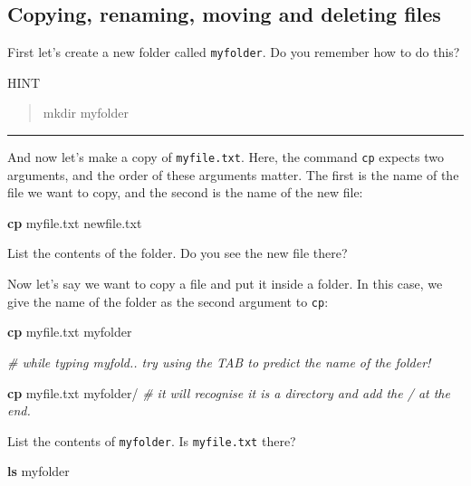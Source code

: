 \documentclass[
]{book}
\newenvironment{Shaded}{\begin{snugshade}}{\end{snugshade}}
\newcommand{\CommentTok}[1]{\textcolor[rgb]{0.56,0.35,0.01}{\textit{#1}}}
\newcommand{\FunctionTok}[1]{\textcolor[rgb]{0.13,0.29,0.53}{\textbf{#1}}}
\newcommand{\NormalTok}[1]{#1}
\begin{document}
\subsection{Copying, renaming, moving and deleting files}\label{copying-renaming-moving-and-deleting-files}

First let's create a new folder called \texttt{myfolder}. Do you remember how to do this?

HINT

\begin{quote}
mkdir myfolder
\end{quote}

\begin{center}\rule{0.5\linewidth}{0.5pt}\end{center}

And now let's make a copy of \texttt{myfile.txt}. Here, the command \texttt{cp} expects two arguments, and the order of these arguments matter. The first is the name of the file we want to copy, and the second is the name of the new file:

\begin{Shaded}
\begin{Highlighting}[]
\FunctionTok{cp}\NormalTok{ myfile.txt newfile.txt}
\end{Highlighting}
\end{Shaded}

List the contents of the folder. Do you see the new file there?

Now let's say we want to copy a file and put it inside a folder. In this case, we give the name of the folder as the second argument to \texttt{cp}:

\begin{Shaded}
\begin{Highlighting}[]
\FunctionTok{cp}\NormalTok{ myfile.txt myfolder }

\CommentTok{\# while typing myfold.. try using the TAB to predict the name of the folder!}

\FunctionTok{cp}\NormalTok{ myfile.txt myfolder/  }\CommentTok{\# it will recognise it is a directory and add the / at the end.}
\end{Highlighting}
\end{Shaded}

List the contents of \texttt{myfolder}. Is \texttt{myfile.txt} there?

\begin{Shaded}
\begin{Highlighting}[]
\FunctionTok{ls}\NormalTok{ myfolder}
\end{Highlighting}
\end{Shaded}
\end{document}
